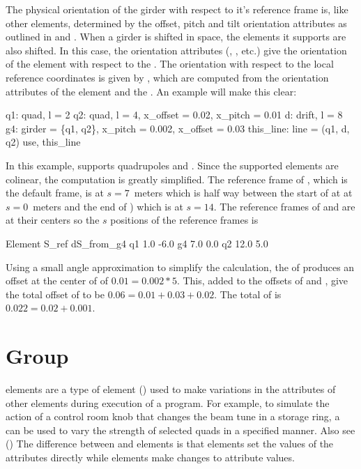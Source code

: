 The physical orientation of the girder with respect to it's reference
frame is, like other elements, determined by the offset, pitch and
tilt orientation attributes as outlined in  and
.  When a girder is shifted in space, the elements
it supports are also shifted.  In this case, the orientation
attributes (, , etc.) give the orientation of
the element with respect to the . The orientation with
respect to the local reference coordinates is given by
, which are computed from the orientation attributes
of the element and the . An example will make this clear:
\begin{example}
  q1: quad, l = 2
  q2: quad, l = 4, x_offset = 0.02, x_pitch = 0.01
  d: drift, l = 8
  g4: girder = \{q1, q2\}, x_pitch = 0.002, x_offset = 0.03
  this_line: line = (q1, d, q2)
  use, this_line
\end{example}
In this example,  supports quadrupoles  and .
Since the supported elements are colinear, the computation is greatly
simplified. The reference frame of , which is the default
 frame, is at $s = 7$~meters which is half way between the
start of  at at $s = 0$~meters and the end of ) which is
at $s = 14$. The reference frames of  and  are at their
centers so the $s$ positions of the reference frames is
\begin{example}
  Element        S_ref   dS_from_g4
  q1             1.0     -6.0
  g4             7.0      0.0
  q2            12.0      5.0
\end{example}
Using a small angle approximation to simplify the calculation, the
 of  produces an offset at the center of  of
$0.01 = 0.002 * 5$. This, added to the offsets of  and ,
give the total offset of  to be $0.06 = 0.01 + 0.03 + 0.02$.
The total  of  is $0.022 = 0.02 + 0.001$.

\section{Group}
\label{s:group}

 elements are a type of  element
() used to make variations in the attributes of
other elements during execution of a program. For example, to simulate
the action of a control room knob that changes the beam tune in a
storage ring, a  can be used to vary the strength of
selected quads in a specified manner. Also see 
() The difference between  and 
elements is that  elements set the values of the
attributes directly while  elements make changes to
attribute values.


